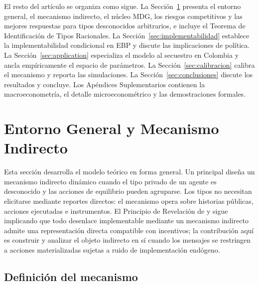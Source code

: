 \documentclass[review,authoryear,12pt]{elsarticle}
\theoremstyle{plain}
\theoremstyle{definition}
\newcommand{\1}{\mathbf{1}}
\begin{document}
El resto del artículo se organiza como sigue. La Sección~\ref{sec:model} presenta el entorno general, el mecanismo indirecto, el núcleo MDG, los riesgos competitivos y las mejores respuestas para tipos desconocidos arbitrarios, e incluye el Teorema de Identificación de Tipos Racionales. La Sección~\ref{sec:implementabilidad} establece la implementabilidad condicional en EBP y discute las implicaciones de política. La Sección~\ref{sec:application} especializa el modelo al secuestro en Colombia y ancla empíricamente el espacio de parámetros. La Sección~\ref{sec:calibracion} calibra el mecanismo y reporta las simulaciones. La Sección~\ref{sec:conclusiones} discute los resultados y concluye. Los Apéndices Suplementarios contienen la macroeconometría, el detalle microeconométrico y las demostraciones formales.


\section{Entorno General y Mecanismo Indirecto}\label{sec:model}

Esta sección desarrolla el modelo teórico en forma general. Un principal diseña un mecanismo indirecto dinámico cuando el tipo privado de un agente es desconocido y las acciones de equilibrio pueden agruparse. Los tipos no necesitan elicitarse mediante reportes directos: el mecanismo opera sobre historias públicas, acciones ejecutadas e instrumentos. El Principio de Revelación de \citet{Gibbard1973} y \citet{Myerson1979IC,Myerson1981} sigue implicando que todo desenlace implementable mediante un mecanismo indirecto admite una representación directa compatible con incentivos; la contribución aquí es construir y analizar el objeto indirecto en sí cuando los mensajes se restringen a acciones materializadas sujetas a ruido de implementación endógeno.

\subsection{Definición del mecanismo}\label{subsec:def-mecanismo}
\end{document}
